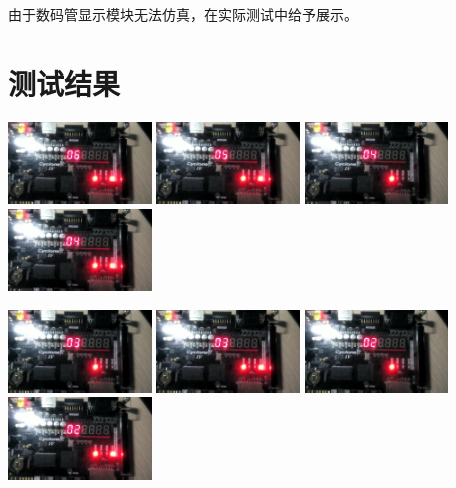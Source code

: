 \documentclass[12pt,a4paper]{article}
\begin{document}
由于数码管显示模块无法仿真，在实际测试中给予展示。
\section{测试结果}
\begin{center}
\includegraphics[width=3.8cm]{pic/test/1}
\includegraphics[width=3.8cm]{pic/test/2}
\includegraphics[width=3.8cm]{pic/test/3}
\includegraphics[width=3.8cm]{pic/test/4}

\vspace*{0.25cm}
\includegraphics[width=3.8cm]{pic/test/5}
\includegraphics[width=3.8cm]{pic/test/6}
\includegraphics[width=3.8cm]{pic/test/7}
\includegraphics[width=3.8cm]{pic/test/8}


\end{center}
\end{document}
